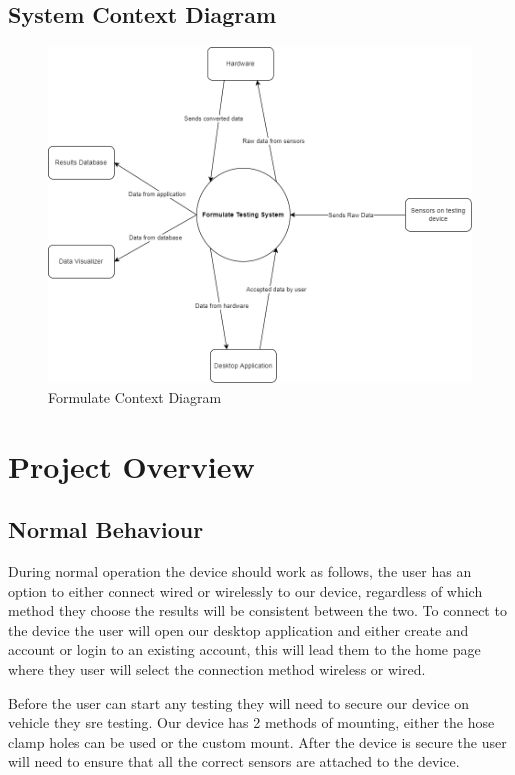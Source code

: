 \documentclass[12pt, titlepage]{article}
\begin{document}
\subsection{System Context Diagram}
\begin{figure}[h!]
  \begin{center}
  \includegraphics[width=1.1\textwidth]{sys_context_diagram}
  \caption{Formulate Context Diagram}
  \end{center}
  \end{figure}
  \newpage

\section{Project Overview}

\subsection{Normal Behaviour}
During normal operation the device should work as follows, the user has an option to either connect wired or wirelessly to our device, regardless of which method they choose the results will be consistent between the two. To connect to the device the user will open our desktop application and either create and account or login to an existing account, this will lead them to the home page where they user will select the connection method wireless or wired.

Before the user can start any testing they will need to secure our device on vehicle they sre testing. Our device has 2 methods of mounting, either the hose clamp holes can be used or the custom mount. After the device is secure the user will need to ensure that all the correct sensors are attached to the device.
\end{document}
